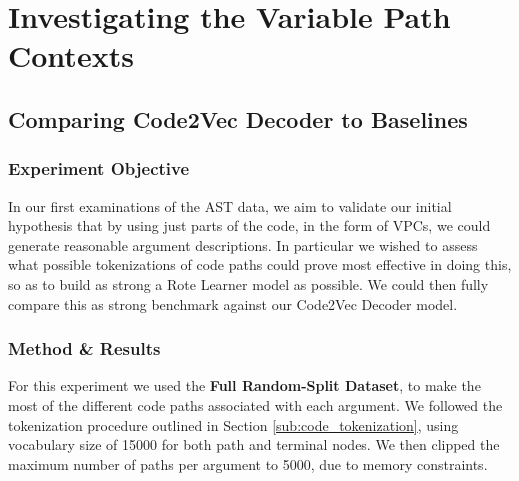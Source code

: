 \section{Investigating the Variable Path Contexts} %
\label{sec:investigating_the_computer_channel}

\subsection{Comparing Code2Vec Decoder to Baselines} %
\label{sub:comparing_code2vec_to_baselines}


\subsubsection{Experiment Objective} %

In our first examinations of the AST data, we aim to validate our initial hypothesis that by using just parts of the code, in the form of VPCs, we could generate reasonable argument descriptions.
In particular we wished to assess what possible tokenizations of code paths could prove most effective in doing this, so as to build as strong a Rote Learner model as possible. We could then fully compare this as strong benchmark against our Code2Vec Decoder model.

\subsubsection{Method \& Results} %

For this experiment we used the \textbf{Full Random-Split Dataset}, to make the most of the different code paths associated with each argument.
We followed the tokenization procedure outlined in Section \ref{sub:code_tokenization}, using vocabulary size of 15000 for both path and terminal nodes. We then clipped the maximum number of paths per argument to 5000, due to memory constraints. 

